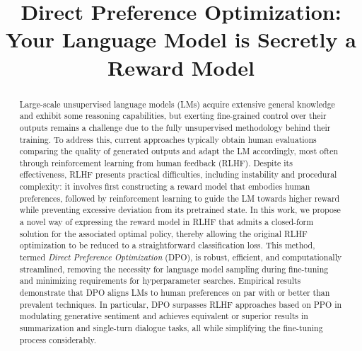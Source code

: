 \title{Direct Preference Optimization: Your Language Model is Secretly a Reward Model}

\begin{abstract}
Large-scale unsupervised language models (LMs) acquire extensive general knowledge and exhibit some reasoning capabilities, but exerting fine-grained control over their outputs remains a challenge due to the fully unsupervised methodology behind their training. To address this, current approaches typically obtain human evaluations comparing the quality of generated outputs and adapt the LM accordingly, most often through reinforcement learning from human feedback (RLHF). Despite its effectiveness, RLHF presents practical difficulties, including instability and procedural complexity: it involves first constructing a reward model that embodies human preferences, followed by reinforcement learning to guide the LM towards higher reward while preventing excessive deviation from its pretrained state. In this work, we propose a novel way of expressing the reward model in RLHF that admits a closed-form solution for the associated optimal policy, thereby allowing the original RLHF optimization to be reduced to a straightforward classification loss. This method, termed \textit{Direct Preference Optimization} (DPO), is robust, efficient, and computationally streamlined, removing the necessity for language model sampling during fine-tuning and minimizing requirements for hyperparameter searches. Empirical results demonstrate that DPO aligns LMs to human preferences on par with or better than prevalent techniques. In particular, DPO surpasses RLHF approaches based on PPO in modulating generative sentiment and achieves equivalent or superior results in summarization and single-turn dialogue tasks, all while simplifying the fine-tuning process considerably.
\end{abstract}

